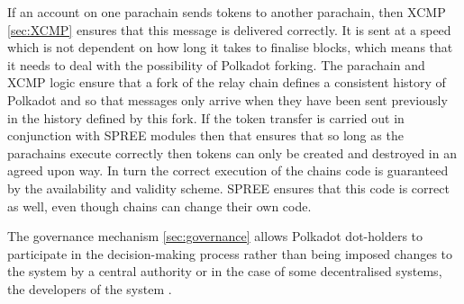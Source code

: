If an account on one parachain sends tokens to another parachain, then XCMP \ref{sec:XCMP} ensures that this message is delivered correctly. It is sent at a speed which is not dependent on how long it takes to finalise blocks, which means that it needs to deal with the possibility of Polkadot forking. The parachain and XCMP logic ensure that a fork of the relay chain defines a consistent history of Polkadot and so that messages only arrive when they have been sent previously in the history defined by this fork. If the token transfer is carried out in conjunction with SPREE modules then that ensures that so long as the parachains execute correctly then tokens can only be created and destroyed in an agreed upon way. In turn the correct execution of the chains code is guaranteed by the availability and validity scheme. SPREE ensures that this code is correct as well, even though chains can change their own code.

The governance mechanism \ref{sec:governance} allows Polkadot dot-holders to participate in the decision-making process rather than being imposed changes to the system by a central authority or in the case of some decentralised systems, the developers of the system .  


